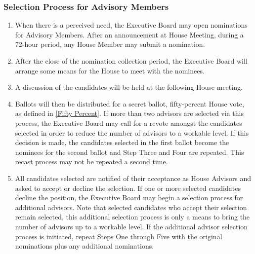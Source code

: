 \documentclass{article}
\newcommand{\bsubsection}[1]{\subsubsection{#1} \label{#1}}
\begin{document}
\bsubsection{Selection Process for Advisory Members}
\begin{enumerate}
	\item When there is a perceived need, the Executive Board may open nominations for Advisory Members.
		After an announcement at House Meeting, during a 72-hour period, any House Member may submit a nomination.
	\item After the close of the nomination collection period, the Executive Board will arrange some means for the House to meet with the nominees.
	\item A discussion of the candidates will be held at the following House meeting.
	\item Ballots will then be distributed for a secret ballot, fifty-percent House vote, as defined in \ref{Fifty Percent}.
		If more than two advisors are selected via this process, the Executive Board may call for a revote amongst the candidates selected in order to reduce the number of advisors to a workable level.
		If this decision is made, the candidates selected in the first ballot become the nominees for the second ballot and Step Three and Four are repeated.
		This recast process may not be repeated a second time.
	\item All candidates selected are notified of their acceptance as House Advisors and asked to accept or decline the selection.
		If one or more selected candidates decline the position, the Executive Board may begin a selection process for additional advisors.
		Note that selected candidates who accept their selection remain selected, this additional selection process is only a means to bring the number of advisors up to a workable level.
		If the additional advisor selection process is initiated, repeat Steps One through Five with the original nominations plus any additional nominations.
\end{enumerate}
\end{document}
